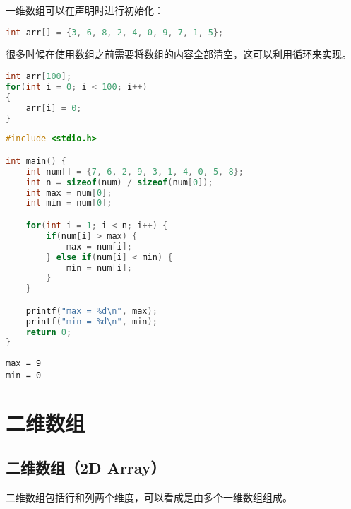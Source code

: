 一维数组可以在声明时进行初始化：

\vspace{-0.5cm}

\begin{lstlisting}[language=C]
int arr[] = {3, 6, 8, 2, 4, 0, 9, 7, 1, 5};
\end{lstlisting}

很多时候在使用数组之前需要将数组的内容全部清空，这可以利用循环来实现。\\


\begin{lstlisting}[language=C]
int arr[100];
for(int i = 0; i < 100; i++)
{
	arr[i] = 0;
}
\end{lstlisting}

\vspace{0.5cm}


\begin{lstlisting}[language=C]
#include <stdio.h>

int main() {
	int num[] = {7, 6, 2, 9, 3, 1, 4, 0, 5, 8};
	int n = sizeof(num) / sizeof(num[0]);
	int max = num[0];
	int min = num[0];

	for(int i = 1; i < n; i++) {
		if(num[i] > max) {
			max = num[i];
		} else if(num[i] < min) {
			min = num[i];
		}
	}

	printf("max = %d\n", max);
	printf("min = %d\n", min);
	return 0;
}
\end{lstlisting}

\begin{tcolorbox}
	\begin{verbatim}
max = 9
min = 0
	\end{verbatim}
\end{tcolorbox}

\newpage

\section{二维数组}

\subsection{二维数组（2D Array）}

二维数组包括行和列两个维度，可以看成是由多个一维数组组成。

\begin{table}[H]
	\centering
\end{table}

